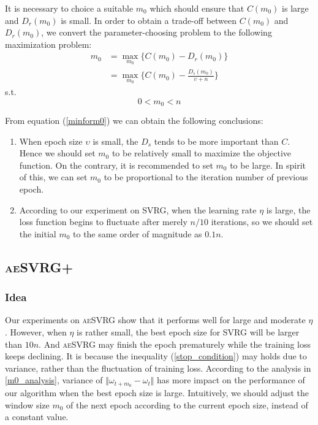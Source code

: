 \documentclass[conference]{IEEEtran}
\begin{document}
It is necessary to choice a suitable $m_0$  which should ensure that $C(m_0)$ is large and $D_r(m_0)$ is small. In order to obtain a trade-off between $C(m_0)$ and $D_r(m_0)$, we convert the parameter-choosing problem to the following maximization problem:
\begin{equation}
\label{minform0}
\begin{split}
m_0 &= \max\limits_{m_0} \{C(m_0)-D_r(m_0)\}\\
&= \max\limits_{m_0} \{C(m_0)-\frac{D_s(m_0)}{\upsilon+n} \}
\end{split}
\end{equation}
\textrm{s.t.} 
\begin{equation}
0<m_0<n
\end{equation}

From equation (\ref{minform0}) we can obtain the following conclusions:
\begin{enumerate}
\item When epoch size $\upsilon$ is small, the $D_s$ tends to be more important than $C$. Hence we should set $m_0$ to be relatively small to maximize the objective function. On the contrary, it is recommended to set $m_0$ to be large. In spirit of this, we can set $m_0$ to be proportional to the iteration number of previous epoch.
\item According to our experiment on SVRG, when the learning rate $\eta$ is large, the loss function begins to fluctuate after merely $n/10$ iterations, so we should set the initial $m_0$ to the same order of magnitude as $0.1 n$.
 \end{enumerate}
 
 \subsection{\textsc{aeSVRG+}}
 \subsubsection{Idea}
 Our experiments on \textsc{aeSVRG} show that it performs well for large and moderate $\eta$. However, when $\eta$ is rather small, the best epoch size for SVRG will be larger than $10n$. And \textsc{aeSVRG} may finish the epoch prematurely while the training loss keeps declining. It is because the inequality (\ref{stop_condition}) may holds due to variance, rather than the fluctuation of training loss. According to the analysis in \ref{m0_analysis}, variance of $\Vert\omega_{t+m_0}-\omega_t\Vert$ has more impact on the performance of our algorithm when the best epoch size is large. Intuitively, we should adjust the window size $m_0$ of the next epoch according to the current epoch size, instead of a constant value.
\end{document}
